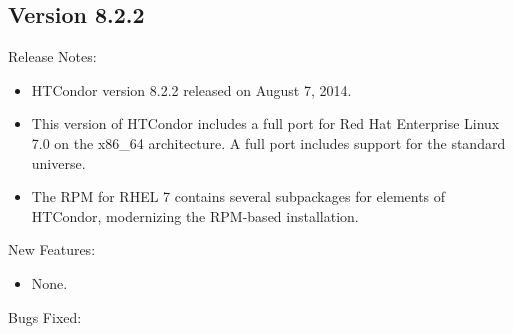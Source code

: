 \subsection*{\label{sec:New-8-2-2}Version 8.2.2}

\noindent Release Notes:

\begin{itemize}

\item HTCondor version 8.2.2 released on August 7, 2014.

\item This version of HTCondor includes a full port for 
Red Hat Enterprise Linux 7.0 on the x86\_64 architecture.
A full port includes support for the standard universe.

\item The RPM for RHEL 7 contains several subpackages for elements of HTCondor,
modernizing the RPM-based installation.

\end{itemize}

\noindent New Features:

\begin{itemize}

\item None.

\end{itemize}

\noindent Bugs Fixed:

